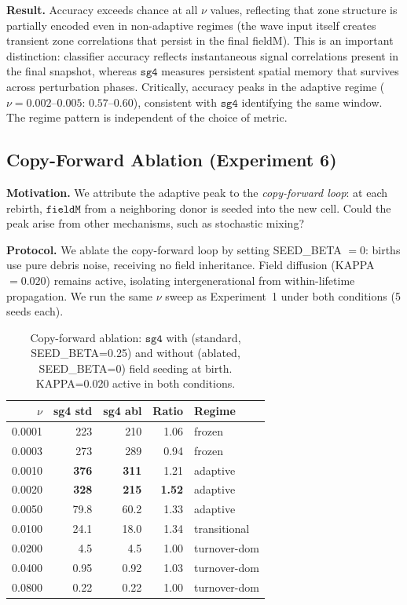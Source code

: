 \documentclass[11pt]{article}
\theoremstyle{remark}
\begin{document}
\textbf{Result.} Accuracy exceeds chance at all $\nu$ values, reflecting that
zone structure is partially encoded even in non-adaptive regimes (the wave input
itself creates transient zone correlations that persist in the final fieldM).
This is an important distinction: classifier accuracy reflects instantaneous
signal correlations present in the final snapshot, whereas $\mathtt{sg4}$
measures persistent spatial memory that survives across perturbation phases.
Critically, accuracy peaks in the adaptive regime ($\nu = 0.002$--$0.005$:
$0.57$--$0.60$), consistent with $\mathtt{sg4}$ identifying the same window.
The regime pattern is independent of the choice of metric.

\subsection{Copy-Forward Ablation (Experiment 6)}

\textbf{Motivation.} We attribute the adaptive peak to the \emph{copy-forward
loop}: at each rebirth, $\mathtt{fieldM}$ from a neighboring donor is seeded
into the new cell. Could the peak arise from other mechanisms, such as
stochastic mixing?

\textbf{Protocol.} We ablate the copy-forward loop by setting SEED\_BETA $= 0$:
births use pure debris noise, receiving no field inheritance. Field diffusion
(KAPPA $= 0.020$) remains active, isolating intergenerational from
within-lifetime propagation. We run the same $\nu$ sweep as Experiment~1 under
both conditions (5 seeds each).

\begin{table}[h]
\centering
\caption{Copy-forward ablation: $\mathtt{sg4}$ with (standard, SEED\_BETA=0.25)
and without (ablated, SEED\_BETA=0) field seeding at birth. KAPPA=0.020 active
in both conditions.}
\label{tab:exp6}
\begin{tabular}{rrrrl}
\toprule
$\nu$ & sg4 std & sg4 abl & Ratio & Regime \\
\midrule
0.0001 & 223  & 210  & 1.06 & frozen \\
0.0003 & 273  & 289  & 0.94 & frozen \\
0.0010 & \textbf{376}  & \textbf{311}  & 1.21 & adaptive \\
0.0020 & \textbf{328}  & \textbf{215}  & \textbf{1.52} & adaptive \\
0.0050 & 79.8 & 60.2 & 1.33 & adaptive \\
0.0100 & 24.1 & 18.0 & 1.34 & transitional \\
0.0200 & 4.5  & 4.5  & 1.00 & turnover-dom \\
0.0400 & 0.95 & 0.92 & 1.03 & turnover-dom \\
0.0800 & 0.22 & 0.22 & 1.00 & turnover-dom \\
\bottomrule
\end{tabular}
\end{table}
\end{document}
